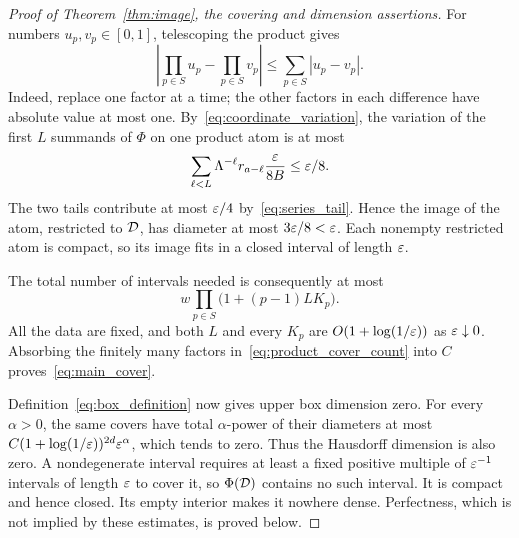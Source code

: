 \begin{proof}[Proof of Theorem~\ref{thm:image}, the covering and dimension assertions]
For numbers $u_p,v_p\in[0,1]$, telescoping the product gives
\begin{equation}\label{eq:product_telescope}
 \left|\prod_{p\in S}u_p-\prod_{p\in S}v_p\right|
 \leq\sum_{p\in S}|u_p-v_p|.
\end{equation}
Indeed, replace one factor at a time; the other factors in each difference
have absolute value at most one. By~\eqref{eq:coordinate_variation}, the
variation of the first $L$ summands of $\Phi$ on one product atom is at most
\[
 \sum_{\ell<L}\Lambda^{-\ell}r_{a-\ell}
                  \frac{\varepsilon}{8B}\leq\varepsilon/8.
\]
The two tails contribute at most $\varepsilon/4$ by~\eqref{eq:series_tail}.
Hence the image of the atom, restricted to $\mathcal D$, has diameter at most
$3\varepsilon/8<\varepsilon$. Each nonempty restricted atom is compact, so its image
fits in a closed interval of length $\varepsilon$.

The total number of intervals needed is consequently at most
\begin{equation}\label{eq:product_cover_count}
 w\prod_{p\in S}\bigl(1+(p-1)LK_p\bigr).
\end{equation}
All the data are fixed, and both $L$ and every $K_p$ are
$O(1+\log(1/\varepsilon))$ as $\varepsilon\downarrow0$.
Absorbing the finitely many factors in~\eqref{eq:product_cover_count}
into $C$ proves~\eqref{eq:main_cover}.

Definition~\eqref{eq:box_definition} now gives upper box dimension zero.
For every $\alpha>0$, the same covers have total $\alpha$-power of their
diameters at most
$C(1+\log(1/\varepsilon))^{2d}\varepsilon^\alpha$, which tends to zero.
Thus the Hausdorff dimension is also zero. A nondegenerate interval
requires at least a fixed positive multiple of $\varepsilon^{-1}$ intervals of
length $\varepsilon$ to cover it, so $\Phi(\mathcal D)$ contains no such interval.
It is compact and hence closed. Its empty interior makes it nowhere dense.
Perfectness, which is not implied by these estimates, is proved below.
\end{proof}
